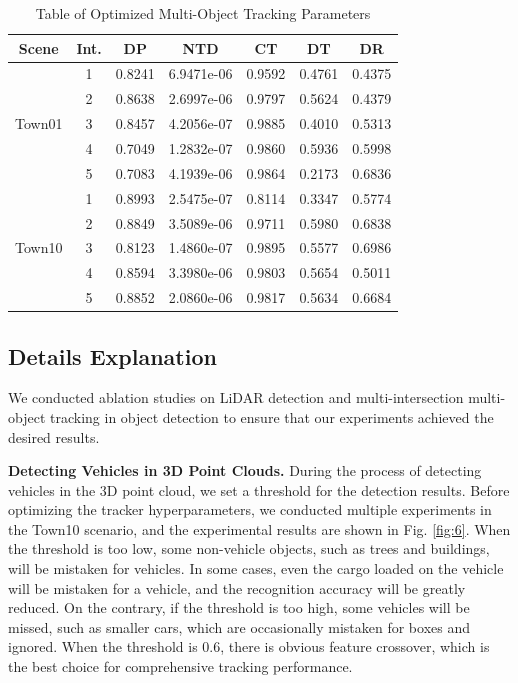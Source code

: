 \documentclass[journal,twoside,web]{ieeecolor}
\begin{document}
\begin{table}[t]
	\centering
	\caption{Table of Optimized Multi-Object Tracking Parameters}
	\label{tab:4}
	\renewcommand\arraystretch{1.3}
	\begin{tabular}{|c|c|c|c|c|c|c|}
		
		\hline
		Scene & Int. & DP & NTD & CT & DT & DR \\
		\hline
		\multirow{5}{*}{Town01} & 1 & 0.8241 & 6.9471e-06 & 0.9592 & 0.4761 & 0.4375 \\
		\cline{2-7}
		& 2 & 0.8638 & 2.6997e-06 & 0.9797 & 0.5624 & 0.4379 \\
		\cline{2-7}
		& 3 & 0.8457 & 4.2056e-07 & 0.9885 & 0.4010 & 0.5313 \\
		\cline{2-7}
		& 4 & 0.7049 & 1.2832e-07 & 0.9860 & 0.5936 & 0.5998 \\
		\cline{2-7}
		& 5 & 0.7083 & 4.1939e-06 & 0.9864 & 0.2173 & 0.6836 \\
		\hline
		\multirow{5}{*}{Town10} & 1 & 0.8993 & 2.5475e-07 & 0.8114 & 0.3347 & 0.5774 \\
		\cline{2-7}
		& 2 & 0.8849 & 3.5089e-06 & 0.9711 & 0.5980 & 0.6838 \\
		\cline{2-7}
		& 3 & 0.8123 & 1.4860e-07 & 0.9895 & 0.5577 & 0.6986 \\
		\cline{2-7}
		& 4 & 0.8594 & 3.3980e-06 & 0.9803 & 0.5654 & 0.5011 \\
		\cline{2-7}
		& 5 & 0.8852 & 2.0860e-06 & 0.9817 & 0.5634 & 0.6684 \\
		\hline
	\end{tabular}
\end{table}

\subsection{Details Explanation}

We conducted ablation studies on LiDAR detection and multi-intersection multi-object tracking in object detection to ensure that our experiments achieved the desired results.

\textbf{Detecting Vehicles in 3D Point Clouds.}
During the process of detecting vehicles in the 3D point cloud, we set a threshold for the detection results.
Before optimizing the tracker hyperparameters, we conducted multiple experiments in the Town10 scenario, and the experimental results are shown in Fig. \ref{fig:6}.
When the threshold is too low, some non-vehicle objects, such as trees and buildings, will be mistaken for vehicles. In some cases, even the cargo loaded on the vehicle will be mistaken for a vehicle, and the recognition accuracy will be greatly reduced.
On the contrary, if the threshold is too high, some vehicles will be missed, such as smaller cars, which are occasionally mistaken for boxes and ignored.
When the threshold is 0.6, there is obvious feature crossover, which is the best choice for comprehensive tracking performance.
\end{document}
